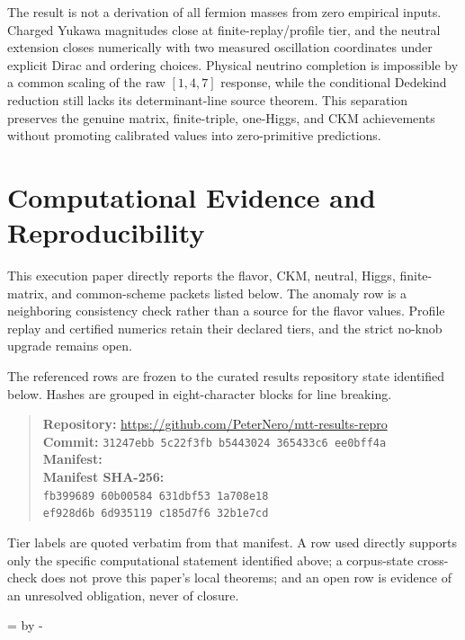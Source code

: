 \documentclass[11pt]{article}
\begin{document}
The result is not a derivation of all fermion masses from zero empirical
inputs. Charged Yukawa magnitudes close at finite-replay/profile tier, and the
neutral extension closes numerically with two measured oscillation
coordinates under explicit Dirac and ordering choices. Physical neutrino
completion is impossible by a common scaling of the raw $[1,4,7]$ response,
while the conditional Dedekind reduction still lacks its determinant-line
source theorem. This separation preserves the genuine matrix, finite-triple,
one-Higgs, and CKM achievements without promoting calibrated values into
zero-primitive predictions.

\section*{Computational Evidence and Reproducibility}
This execution paper directly reports the flavor, CKM, neutral, Higgs, finite-matrix, and common-scheme packets listed below. The anomaly row is a neighboring consistency check rather than a source for the flavor values. Profile replay and certified numerics retain their declared tiers, and the strict no-knob upgrade remains open.

The referenced rows are frozen to the curated results repository state identified below. Hashes are grouped in eight-character blocks for line breaking.
\begin{quote}\small
\textbf{Repository:} \url{https://github.com/PeterNero/mtt-results-repro}\\
\textbf{Commit:} \texttt{31247ebb 5c22f3fb b5443024 365433c6 ee0bff4a}\\
\textbf{Manifest:} \\
\textbf{Manifest SHA-256:}\\
\texttt{fb399689 60b00584 631dbf53 1a708e18}\\
\texttt{ef928d6b 6d935119 c185d7f6 32b1e7cd}
\end{quote}

Tier labels are quoted verbatim from that manifest. A row used directly supports only the specific computational statement identified above; a corpus-state cross-check does not prove this paper's local theorems; and an open row is evidence of an unresolved obligation, never of closure.

\par\begingroup{}=\pagegoal\advance{} by -\pagetotal\ifdim\dimen0<7\baselineskip\newpage\fi\endgroup
\end{document}
